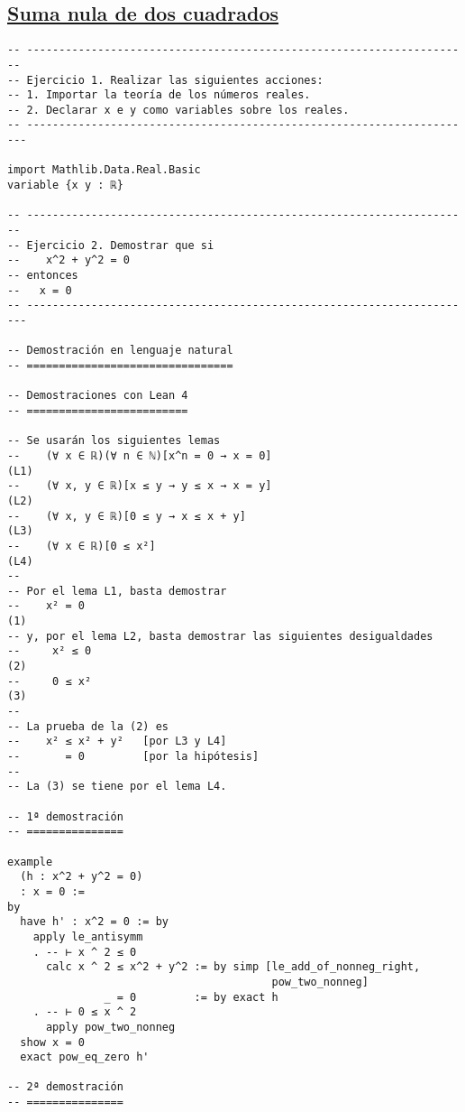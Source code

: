 \subsection{\href{./src/Logica/Suma\_nula\_de\_dos\_cuadrados.lean}{Suma nula de dos cuadrados}}
\label{sec:org7368cc4}
\begin{verbatim}
-- ---------------------------------------------------------------------
-- Ejercicio 1. Realizar las siguientes acciones:
-- 1. Importar la teoría de los números reales.
-- 2. Declarar x e y como variables sobre los reales.
-- ----------------------------------------------------------------------

import Mathlib.Data.Real.Basic
variable {x y : ℝ}

-- ---------------------------------------------------------------------
-- Ejercicio 2. Demostrar que si
--    x^2 + y^2 = 0
-- entonces
--   x = 0
-- ----------------------------------------------------------------------

-- Demostración en lenguaje natural
-- ================================

-- Demostraciones con Lean 4
-- =========================

-- Se usarán los siguientes lemas
--    (∀ x ∈ ℝ)(∀ n ∈ ℕ)[x^n = 0 → x = 0]                            (L1)
--    (∀ x, y ∈ ℝ)[x ≤ y → y ≤ x → x = y]                            (L2)
--    (∀ x, y ∈ ℝ)[0 ≤ y → x ≤ x + y]                                (L3)
--    (∀ x ∈ ℝ)[0 ≤ x²]                                              (L4)
--
-- Por el lema L1, basta demostrar
--    x² = 0                                                         (1)
-- y, por el lema L2, basta demostrar las siguientes desigualdades
--     x² ≤ 0                                                        (2)
--     0 ≤ x²                                                        (3)
--
-- La prueba de la (2) es
--    x² ≤ x² + y²   [por L3 y L4]
--       = 0         [por la hipótesis]
--
-- La (3) se tiene por el lema L4.

-- 1ª demostración
-- ===============

example
  (h : x^2 + y^2 = 0)
  : x = 0 :=
by
  have h' : x^2 = 0 := by
    apply le_antisymm
    . -- ⊢ x ^ 2 ≤ 0
      calc x ^ 2 ≤ x^2 + y^2 := by simp [le_add_of_nonneg_right,
                                         pow_two_nonneg]
               _ = 0         := by exact h
    . -- ⊢ 0 ≤ x ^ 2
      apply pow_two_nonneg
  show x = 0
  exact pow_eq_zero h'

-- 2ª demostración
-- ===============


\end{verbatim}
